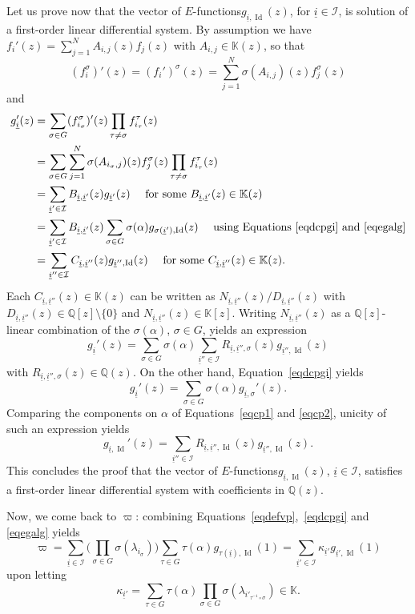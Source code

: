 \documentclass[11pt]{article}
\numberwithin{equation}{section}
\newcommand{\Efunctions}{$E$\nobreakdash-func\-tions\xspace}
\theoremstyle{definition}
\newcommand{\Q}{\mathbb{Q}}
\newcommand{\K}{\mathbb{K}}
\DeclareMathOperator{\Id}{Id}
\newcommand{\calI}{\mathcal I}
\newcommand{\isoul}{{\underline{i}}}
\begin{document}
Let us prove now that the vector of \Efunctions $g_{ \isoul ,\Id}(z)$, for $\isoul\in\calI$, is solution of a first-order linear differential system. By assumption we have $f_i'(z) = \sum_{j=1}^N A_{i,j}(z) f_j(z)$ with $A_{i,j}\in\K(z)$, so that
\[
(f_i^\sigma)'(z) = (f_i')^\sigma(z)=\sum_{j=1}^N \sigma(A_{i,j})(z) f_j^\sigma(z)
\]
and
\begin{align*}
g_\isoul '(z)
&=\sum_{\sigma\in G} ( f_{i_\sigma}^\sigma)'(z) \prod_{\tau\neq \sigma}
f_{i_\tau}^\tau (z)\\
&= \sum_{\sigma\in G} \sum_{j=1}^N \sigma(A_{i_\sigma,j})(z) f_j^\sigma(z)
\prod_{\tau\neq \sigma} f_{i_\tau}^\tau(z) \\
&= \sum_{\isoul' \in\calI } B_{\isoul,\isoul'}(z)g_{\isoul'}(z) \quad \mbox{ for some }
B_{\isoul,\isoul'}(z)\in\K(z)\\
&= \sum_{\isoul' \in\calI } B_{\isoul,\isoul'}(z) \sum_{\sigma\in G} \sigma(\alpha) g_{\sigma(\isoul'),\Id}(z) \quad \mbox{ using Equations~\eqref{eqdcpgi} and \eqref{eqegalg}}\\
&= \sum_{\isoul'' \in\calI } C_{\isoul,\isoul''}(z) g_{\isoul'',\Id}(z) \quad \mbox{ for some }
C_{\isoul,\isoul''}(z)\in\K(z).
\end{align*}
Each $C_{\isoul,\isoul''}(z)\in\K(z)$ can be written as $N_{\isoul,\isoul''}(z)/D_{\isoul,\isoul''}(z)$ with $D_{\isoul,\isoul''}(z)\in\Q[z]\setminus\{0\}$ and $N_{\isoul,\isoul''}(z)\in\K[z]$. Writing $N_{\isoul,\isoul''}(z)$ as a $\Q[z]$-linear combination of the $\sigma(\alpha)$, $\sigma\in G$, yields an expression
\begin{equation} \label{eqcp1}
g_\isoul '(z) = \sum_{\sigma\in G} \sigma(\alpha)\sum_{\isoul'' \in\calI } R_{\isoul,\isoul'',\sigma}(z) g_{\isoul'',\Id}(z)
\end{equation}
with $R_{\isoul,\isoul'',\sigma}(z) \in\Q(z) $. On the other hand, Equation~\eqref{eqdcpgi} yields
\begin{equation} \label{eqcp2}
g_\isoul '(z) = \sum_{\sigma\in G} \sigma(\alpha) g_{\isoul ,\sigma}'(z).
\end{equation}
Comparing the components on $\alpha$ of Equations~\eqref{eqcp1} and \eqref{eqcp2}, unicity of such an expression yields
\[
g_{\isoul ,\Id}'(z) = \sum_{\isoul'' \in\calI }R_{\isoul,\isoul'',\Id}(z) g_{\isoul'',\Id}(z) .
\]
This concludes the proof that the vector of \Efunctions $g_{ \isoul ,\Id}(z)$, $\isoul\in\calI$, satisfies a first-order linear differential system with coefficients in $\Q(z)$.

Now, we come back to $\varpi$: combining Equations~\eqref{eqdefvp},~\eqref{eqdcpgi} and \eqref{eqegalg} yields
\begin{equation} \label{eqdcpsurQ}
\varpi = \sum_{\isoul\in\calI} \Big( \prod_{\sigma\in G} \sigma(\lambda_{i_\sigma})\Big)
\sum_{\tau\in G}\tau(\alpha) g_{\tau(\isoul), \Id}(1) = \sum_{\isoul'\in\calI} \kappa_{\isoul'} g_{\isoul', \Id}(1)
\end{equation}
upon letting
\[
\kappa_{\isoul'} = \sum_{\tau\in G}\tau(\alpha)\prod_{\sigma\in G} \sigma(\lambda_{i'_{\tau^{-1}\circ\sigma}})\in\K.
\]
\end{document}
